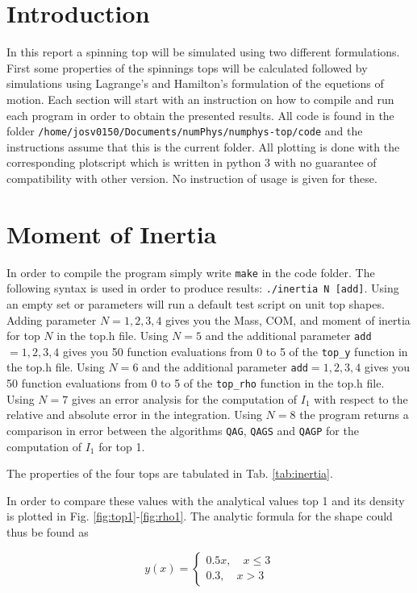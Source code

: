 \section{Introduction}

In this report a spinning top will be simulated using two different formulations. First some properties of the spinnings tops will be calculated followed by simulations using Lagrange's and Hamilton's formulation of the equetions of motion. Each section will start with an instruction on how to compile and run each program in order to obtain the presented results. All code is found in the folder \newline\verb|/home/josv0150/Documents/numPhys/numphys-top/code| and the instructions assume that this is the current folder. All plotting is done with the corresponding plotscript which is written in python 3 with no guarantee of compatibility with other version. No instruction of usage is given for these.

\section{Moment of Inertia}

In order to compile the program simply write \verb|make| in the code folder. The following syntax is used in order to produce results: \verb|./inertia N [add]|. Using an empty set or parameters will run a default test script on unit top shapes. Adding parameter $N = 1,2,3,4$ gives you the Mass, COM, and moment of inertia for top $N$ in the top.h file. Using $N=5$ and the additional parameter \verb|add|$ = 1,2,3,4$ gives you 50 function evaluations from 0 to 5 of the \verb|top_y| function in the top.h file. Using $N=6$ and the additional parameter \verb|add|$ = 1,2,3,4$ gives you 50 function evaluations from 0 to 5 of the \verb|top_rho| function in the top.h file. Using $N=7$ gives an error analysis for the computation of $I_1$ with respect to the relative and absolute error in the integration. Using $N=8$ the program returns a comparison in error between the algorithms \verb|QAG|, \verb|QAGS| and \verb|QAGP| for the computation of $I_1$ for top 1.

The properties of the four tops are tabulated in Tab. \ref{tab:inertia}.

In order to compare these values with the analytical values top 1 and its density is plotted in Fig. \ref{fig:top1}-\ref{fig:rho1}. The analytic formula for the shape could thus be found as

\begin{equation}
  \label{eq:y1}
  y(x) = \left\{ \begin{array}{lr}
    0.5 x, \quad x \le 3 \\
    0.3, \quad x > 3
  \end{array} \right.
\end{equation}


